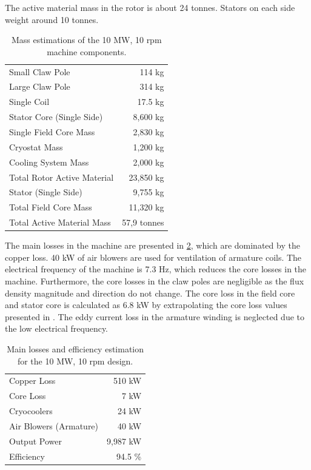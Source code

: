 \documentclass[12pt]{iopart}
\begin{document}
The active material mass in the rotor is about 24 tonnes. Stators on each side weight around 10 tonnes.

\begin{table}[]
  \centering
  \begin{tabular}{lr}
\hline
Small Claw Pole & 114 kg \\
Large Claw Pole & 314 kg \\
Single Coil & 17.5 kg \\
Stator Core (Single Side) & 8,600 kg \\
Single Field Core Mass & 2,830 kg \\
\hline
Cryostat Mass & 1,200 kg \\
Cooling System Mass & 2,000 kg \\
Total Rotor Active Material & 23,850 kg \\
Stator (Single Side) & 9,755 kg \\
Total Field Core Mass & 11,320 kg \\
\hline
Total Active Material Mass & 57,9 tonnes \\
\hline
 \end{tabular}
  \caption{Mass estimations of the 10 MW, 10 rpm machine components.}
  \label{10MW_mass_spec}
\end{table}

The main losses in the machine are presented in \ref{10MW_efficiency}, which are dominated by the copper loss. 40 kW of air blowers are used for ventilation of armature coils. 
The electrical frequency of the machine is 7.3 Hz, which reduces the core losses in the machine. Furthermore, the core losses in the claw poles are negligible as the flux density magnitude and direction do not change. The core loss in the field core and stator core is calculated as 6.8 kW by extrapolating the core loss values presented in \cite{vacoflux}. The eddy current loss in the armature winding is neglected due to the low electrical frequency.


\begin{table}[t]
  \centering
  \begin{tabular}{lr}
\hline
Copper Loss & 510 kW \\
Core Loss & 7 kW \\
Cryocoolers & 24 kW \\
Air Blowers (Armature) & 40 kW \\
Output Power & 9,987 kW \\
\hline
Efficiency & 94.5 \% \\
\hline
\end{tabular}
  \caption{Main losses and efficiency estimation for the 10 MW, 10 rpm design.}
  \label{10MW_efficiency}
\end{table}
\end{document}
